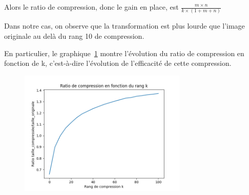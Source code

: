 \documentclass{article}
\begin{document}
Alors le ratio de compression, donc le gain en place, est $\frac{m \times n}{k \times (1+m+n)}$ \newline

Dans notre cas, on observe que la transformation est plus lourde que l'image originale au delà du rang 10 de compression.

En particulier, le graphique~\ref{img:ratioCompression} montre l'évolution du ratio de compression en fonction de k, c'est-à-dire l'évolution
de l'efficacité de cette compression.

\begin{figure}[!htb]
  \caption[]{}
  \label{img:ratioCompression}
  \centering
  \includegraphics[width=8cm]{../files/ratio_de_compression.png}
\end{figure}
\end{document}
